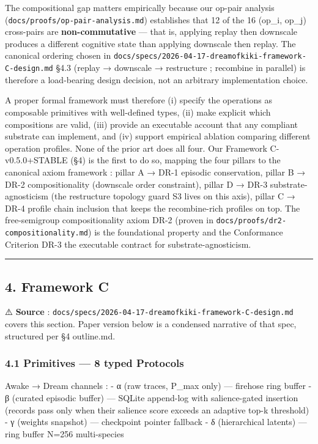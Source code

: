 \documentclass[
]{article}
\begin{document}
The compositional gap matters empirically because our op-pair analysis
(\texttt{docs/proofs/op-pair-analysis.md}) establishes that 12 of the 16
(op\_i, op\_j) cross-pairs are \textbf{non-commutative} --- that is,
applying replay then downscale produces a different cognitive state than
applying downscale then replay. The canonical ordering chosen in
\texttt{docs/specs/2026-04-17-dreamofkiki-framework-C-design.md} §4.3
(replay → downscale → restructure ; recombine in parallel) is therefore
a load-bearing design decision, not an arbitrary implementation choice.

A proper formal framework must therefore (i) specify the operations as
composable primitives with well-defined types, (ii) make explicit which
compositions are valid, (iii) provide an executable account that any
compliant substrate can implement, and (iv) support empirical ablation
comparing different operation profiles. None of the prior art does all
four. Our Framework C-v0.5.0+STABLE (§4) is the first to do so, mapping
the four pillars to the canonical axiom framework : pillar A → DR-1
episodic conservation, pillar B → DR-2 compositionality (downscale order
constraint), pillar D → DR-3 substrate-agnosticism (the restructure
topology guard S3 lives on this axis), pillar C → DR-4 profile chain
inclusion that keeps the recombine-rich profiles on top. The
free-semigroup compositionality axiom DR-2 (proven in
\texttt{docs/proofs/dr2-compositionality.md}) is the foundational
property and the Conformance Criterion DR-3 the executable contract for
substrate-agnosticism.

\begin{center}\rule{0.5\linewidth}{0.5pt}\end{center}

\subsection{4. Framework C}\label{framework-c}

⚠️ \textbf{Source} :
\texttt{docs/specs/2026-04-17-dreamofkiki-framework-C-design.md} covers
this section. Paper version below is a condensed narrative of that spec,
structured per §4 outline.md.

\subsubsection{4.1 Primitives --- 8 typed
Protocols}\label{primitives-8-typed-protocols}

Awake → Dream channels : - α (raw traces, P\_max only) --- firehose ring
buffer - β (curated episodic buffer) --- SQLite append-log with
salience-gated insertion (records pass only when their salience score
exceeds an adaptive top-k threshold) - γ (weights snapshot) ---
checkpoint pointer fallback - δ (hierarchical latents) --- ring buffer
N=256 multi-species
\end{document}
